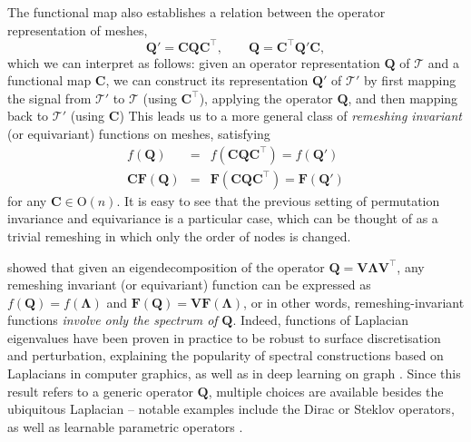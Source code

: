 The functional map also establishes a relation between the operator representation of meshes, 
$$
\mathbf{Q}' = \mathbf{C} \mathbf{Q} \mathbf{C}^\top, \quad \quad \mathbf{Q} = \mathbf{C}^\top \mathbf{Q}' \mathbf{C}, 
$$
%
which we can interpret as follows: given an operator representation $\mathbf{Q}$ of $\mathcal{T}$ and a functional map $\mathbf{C}$, we can construct its representation $\mathbf{Q}'$ of $\mathcal{T}'$ by first mapping the signal from $\mathcal{T}'$ to $\mathcal{T}$ (using $\mathbf{C}^\top$), applying the operator $\mathbf{Q}$, and then mapping back to $\mathcal{T}'$ (using $\mathbf{C}$)
%
This leads us to a more general class of {\em remeshing  invariant} (or equivariant) functions on meshes, satisfying 
%
\begin{eqnarray*}
f(\mathbf{Q}) &=& f(\mathbf{C}\mathbf{Q}\mathbf{C}^\top) = f(\mathbf{Q}')\\
%
\mathbf{C}\mathbf{F}(\mathbf{Q}) &=& \mathbf{F}(\mathbf{C}\mathbf{Q}\mathbf{C}^\top) = \mathbf{F}(\mathbf{Q}')
\end{eqnarray*}
% 
for any $\mathbf{C} \in \mathrm{O}(n)$. 
%
It is easy to see that the previous setting of permutation invariance and equivariance is a particular case,  
which can be thought of as a trivial remeshing in which only the order of nodes is changed.


\cite{wang2019learning} showed that given an eigendecomposition of the operator $\mathbf{Q} = \mathbf{V}\boldsymbol{\Lambda}\mathbf{V}^\top$, any remeshing invariant (or equivariant) function can be expressed as 
%
%
$f(\mathbf{Q}) = f(\boldsymbol{\Lambda})$ and 
%
$\mathbf{F}(\mathbf{Q}) = \mathbf{V} \mathbf{F}(\boldsymbol{\Lambda})$, 
%
or in other words, remeshing-invariant functions {\em involve only the spectrum of} $\mathbf{Q}$. 
%
%
Indeed, functions of Laplacian eigenvalues have been proven in practice to be robust to surface discretisation and perturbation, explaining the popularity of spectral constructions based on Laplacians in computer graphics, as well as in deep learning on graph \citep{defferrard2016convolutional,levie2018cayleynets}. 
%
%
%
Since this result refers to a generic operator $\mathbf{Q}$, multiple choices are available besides the ubiquitous Laplacian -- notable examples include the Dirac \citep{liu2017dirac,kostrikov2018surface} or Steklov \citep{wang2018steklov} operators, as well as learnable parametric operators \citep{wang2019learning}. 





